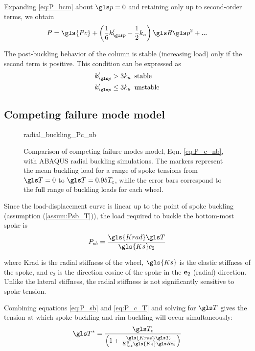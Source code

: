 \documentclass[\rootdir/thesis.tex]{subfiles}
\begin{document}
Expanding \eqref{eq:P_hcm} about $\p=0$ and retaining only up to second-order terms, we obtain
\begin{equation}
\label{eq:P_series_hcm}
P = \gls{Pc} + \left(\frac{1}{6}k'_{\p} - \frac{1}{2}k_u\right)\R\p^2 + ...
\end{equation}

The post-buckling behavior of the column is stable (increasing load) only if the second term is positive. This condition can be expressed as
\begin{align}
\begin{split}
\label{eq:pb_stability_hcm}
k'_{\p} > 3k_u & \,\,\,\text{stable}\\
k'_{\p} \leq 3k_u & \,\,\,\text{unstable}
\end{split}
\end{align}

\subsection{Competing failure mode model}
\label{sec:Pc_nb}

\begin{figure}[t]
\centering
{radial_buckling_Pc_nb}
\caption{Comparison of competing failure modes model, Eqn. \eqref{eq:P_c_nb}, with ABAQUS radial buckling simulations. The markers represent the mean buckling load for a range of spoke tensions from $\T=0$ to $\T=0.95T_c$, while the error bars correspond to the full range of buckling loads for each wheel.}
\label{fig:Pc_rad_theory_comp}
\end{figure}

Since the load-displacement curve is linear up to the point of spoke buckling (assumption (\ref{assum:Psb_T})), the load required to buckle the bottom-most spoke is
\begin{equation}
\label{eq:P_sb}
P_{sb} = \frac{\gls{Krad} \T}{\gls{Ks} c_2}
\end{equation}

where \gls{Krad} is the radial stiffness of the wheel, $\gls{Ks}$ is the elastic stiffness of the spoke, and $c_2$ is the direction cosine of the spoke in the $\mathbf{e}_2$ (radial) direction. Unlike the lateral stiffness, the radial stiffness is not significantly sensitive to spoke tension.

Combining equations \eqref{eq:P_sb} and \eqref{eq:P_c_T} and solving for $\T$ gives the tension at which spoke buckling and rim buckling will occur simultaneously:
\begin{equation}
\label{eq:T_nb}
\T^* = \frac{\T_c}{\left(1 + \frac{\gls{Krad} \T_c}{K_{lat}^0 \gls{Ks} \R c_2}\right)}
\end{equation}
\end{document}
